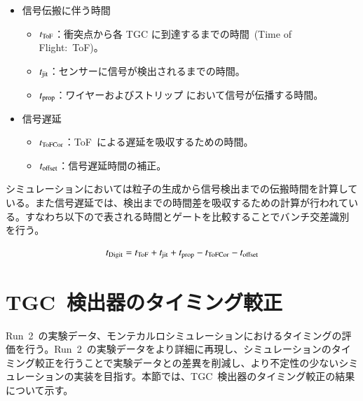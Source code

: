 \begin{itemize}
\item 信号伝搬に伴う時間
\begin{itemize}
\item $t_{\rm{ToF}}$：衝突点から各 TGC に到達するまでの時間~(Time of Flight:~ToF)。
\item $t_{\rm{jit}}$：センサーに信号が検出されるまでの時間。
\item $t_{\rm{prop}}$：ワイヤーおよびストリップ において信号が伝播する時間。
\end{itemize}
\end{itemize}
\begin{itemize}
\item 信号遅延
\begin{itemize}
\item $t_{\rm{ToFCor}}$：ToF~による遅延を吸収するための時間。
\item $t_{\rm{offset}}$：信号遅延時間の補正。
\end{itemize}
\end{itemize}

シミュレーションにおいては粒子の生成から信号検出までの伝搬時間を計算している。また信号遅延では、検出までの時間差を吸収するための計算が行われている。すなわち以下ので表される時間とゲートを比較することでバンチ交差識別を行う。

\begin{align}
    \it{t_{\rm{Digit}}=t_{\rm{ToF}}+t_{\rm{jit}}+t_{\rm{prop}}-t_{\rm{ToFCor}}-t_{\rm{offset}}}\label{eq:tdigit}
\end{align}

\section{TGC~検出器のタイミング較正}
Run~2~の実験データ、モンテカルロシミュレーションにおけるタイミングの評価を行う。Run~2~の実験データをより詳細に再現し、シミュレーションのタイミング較正を行うことで実験データとの差異を削減し、より不定性の少ないシミュレーションの実装を目指す。本節では、TGC~検出器のタイミング較正の結果について示す。


